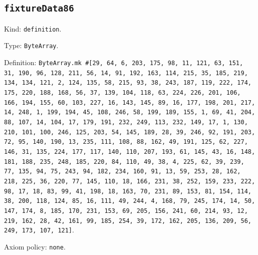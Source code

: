 \documentclass[11pt]{article}
\begin{document}
\subsection*{\texttt{fixtureData86}}
\noindent Kind: \texttt{definition}.\par
\noindent Type: \texttt{ByteArray}.\par
\noindent Definition: \texttt{ByteArray.mk \#[29, 64, 6, 203, 175, 98, 11, 121, 63, 151, 31, 190, 96, 128, 211, 56, 14, 91, 192, 163, 114, 215, 35, 185, 219, 134, 134, 121, 2, 124, 135, 58, 215, 93, 38, 243, 187, 119, 222, 174, 175, 220, 188, 168, 56, 37, 139, 104, 118, 63, 224, 226, 201, 106, 166, 194, 155, 60, 103, 227, 16, 143, 145, 89, 16, 177, 198, 201, 217, 14, 248, 1, 199, 194, 45, 108, 246, 58, 199, 189, 155, 1, 69, 41, 204, 88, 107, 14, 104, 17, 179, 191, 232, 249, 113, 232, 149, 17, 1, 130, 210, 101, 100, 246, 125, 203, 54, 145, 189, 28, 39, 246, 92, 191, 203, 72, 95, 140, 190, 13, 235, 111, 108, 88, 162, 49, 191, 125, 62, 227, 146, 31, 135, 224, 177, 117, 140, 110, 207, 193, 61, 145, 43, 16, 148, 181, 188, 235, 248, 185, 220, 84, 110, 49, 38, 4, 225, 62, 39, 239, 77, 135, 94, 75, 243, 94, 182, 234, 160, 91, 13, 59, 253, 28, 162, 218, 225, 36, 220, 77, 145, 110, 18, 166, 231, 38, 252, 159, 233, 222, 98, 17, 18, 83, 99, 41, 198, 18, 163, 70, 231, 89, 153, 81, 154, 114, 38, 200, 118, 124, 85, 16, 111, 49, 244, 4, 168, 79, 245, 174, 14, 50, 147, 174, 8, 185, 170, 231, 153, 69, 205, 156, 241, 60, 214, 93, 12, 219, 162, 28, 42, 161, 99, 185, 254, 39, 172, 162, 205, 136, 209, 56, 249, 173, 107, 121]}.\par
\noindent Axiom policy: \texttt{none}.\par
\end{document}
